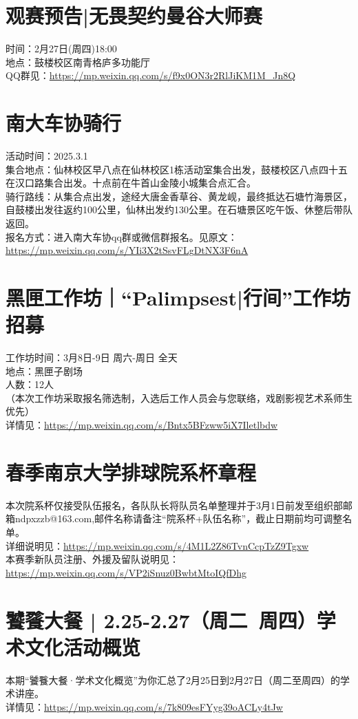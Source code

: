 \documentclass[letterpaper, 12pt]{article}
\begin{document}
\begin{multicols}{2}
\section{观赛预告|无畏契约曼谷大师赛}
时间：2月27日(周四)18:00\\
地点：鼓楼校区南青格庐多功能厅\\
QQ群见：\url{https://mp.weixin.qq.com/s/f9x0ON3r2RlJiKM1M_Jn8Q}

\section{南大车协骑行}
活动时间：2025.3.1\\
集合地点：仙林校区早八点在仙林校区1栋活动室集合出发，鼓楼校区八点四十五在汉口路集合出发。十点前在牛首山金陵小城集合点汇合。\\
骑行路线：从集合点出发，途经大唐金香草谷、黄龙岘，最终抵达石塘竹海景区，自鼓楼出发往返约100公里，仙林出发约130公里。在石塘景区吃午饭、休整后带队返回。\\
报名方式：进入南大车协qq群或微信群报名。见原文：\url{https://mp.weixin.qq.com/s/YIi3X2tSsvFLgDtNX3F6nA}


\section{黑匣工作坊｜“Palimpsest|行间”工作坊招募}
工作坊时间：3月8日-9日 周六-周日 全天\\
地点：黑匣子剧场\\
人数：12人\\
（本次工作坊采取报名筛选制，入选后工作人员会与您联络，戏剧影视艺术系师生优先）\\
详情见：\url{https://mp.weixin.qq.com/s/Bntx5BFzww5iX7Iletlbdw}


\section{春季南京大学排球院系杯章程}
本次院系杯仅接受队伍报名，各队队长将队员名单整理并于3月1日前发至组织部邮箱ndpxzzb@163.com,邮件名称请备注“院系杯+队伍名称”，截止日期前均可调整名单。\\
详细说明见：\url{https://mp.weixin.qq.com/s/4M1L2Z86TvnCcpTzZ9Tgxw}\\
本赛季新队员注册、外援及留队说明见：\url{https://mp.weixin.qq.com/s/VP2iSnuz0BwbtMtoIQfDhg}

\section{饕餮大餐 | 2.25-2.27（周二~周四）学术文化活动概览}
本期“饕餮大餐·学术文化概览”为你汇总了2月25日到2月27日（周二至周四）的学术讲座。\\
详情见：\url{https://mp.weixin.qq.com/s/7k809esFYyg39oACLy4tJw}

\end{multicols} 
\end{document}
